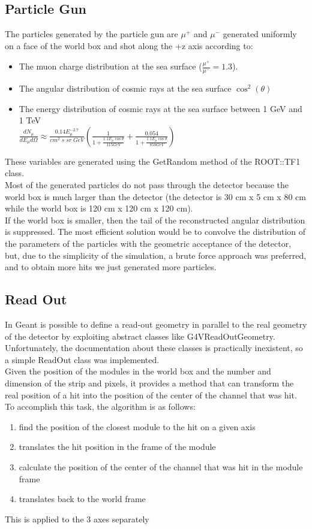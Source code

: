 \documentclass[10pt, a4paper, twocolumn]{article} %
\begin{document}
\subsection{Particle Gun}
\label{ssec:PG}
The particles generated by the particle gun are $\mu^+$ and $\mu^-$ generated uniformly on a face of the world box and shot along the +z axis according to:
\begin{itemize} 
    \item The muon charge distribution at the sea surface ($\frac{\mu^+}{\mu^-}=1.3$).
    \item The angular distribution of cosmic rays at the sea surface $\cos^2(\theta)$
    \item The energy distribution of cosmic rays at the sea surface between 1 GeV and 1 TeV
    \\
    $ \frac{dN_{\mu}}{dE_{\mu} d \Omega} \approx \frac{0.14 E_{\mu}^{-2.7}}{cm^2 \; s \;sr \; GeV} \left( \frac{1}{1+\frac{1.1 E_{\mu}\cos{\theta}}{115 GeV}} + \frac{0.054}{1+\frac{1.1 E_{\mu}\cos{\theta}}{850 GeV}} \right) $
\end{itemize}
These variables are generated using the GetRandom method of the ROOT::TF1 class.
\\
Most of the generated particles do not pass through the detector because the world box is much larger than the detector (the detector is 30 cm x 5 cm x 80 cm while the world box is 120 cm x 120 cm x 120 cm).
\\
If the world box is smaller, then the tail of the reconstructed angular distribution is suppressed.
The most efficient solution would be to convolve the distribution of the parameters of the particles with the geometric acceptance of the detector, but, due to the simplicity of the simulation, a brute force approach was preferred, and to obtain more hits we just generated more particles.
\subsection{Read Out}
In Geant is possible to define a read-out geometry in parallel to the real geometry of the detector by exploiting abstract classes like G4VReadOutGeometry. Unfortunately, the documentation about these classes is practically inexistent, so a simple ReadOut class was implemented.
\\
Given the position of the modules in the world box and the number and dimension of the strip and pixels, it provides a method that can transform the real position of a hit into the position of the center of the channel that was hit.
\\
To accomplish this task, the algorithm is as follows:
\begin{enumerate}
    \item find the position of the closest module to the hit on a given axis
    \item translates the hit position in the frame of the module
    \item calculate the position of the center of the channel that was hit in the module frame
    \item translates back to the world frame
\end{enumerate}
This is applied to the 3 axes separately
\end{document}
